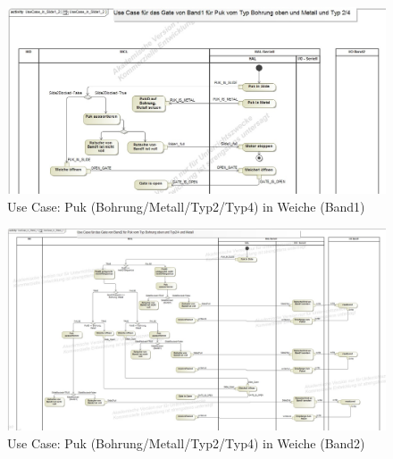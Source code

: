 \documentclass[
   draft=false
  ,paper=a4
  ,twoside=true
  ,fontsize=11pt
  ,headsepline
  ,DIV11
  ,parskip=full+
]{scrartcl} %
\begin{document}
\begin{figure}[H]
\begin{addmargin*}[-2.25cm]{0.1\textwidth}

  	\centering
    \includegraphics [width=1.3\textwidth]{./IMG/UseCaseInSlide12.jpg}
    \caption[short Name]{Use Case: Puk (Bohrung/Metall/Typ2/Typ4) in Weiche (Band1)}
    	\label{fig:uc3slide}
\end{addmargin*}
\end{figure}

\begin{figure}[H]
\begin{addmargin*}[0cm]{-0.16\textwidth}
  	\centering
    \includegraphics [width=1.3\textwidth]{./IMG/UseCaseInSlide21.jpg}
    \caption[short Name]{Use Case: Puk (Bohrung/Metall/Typ2/Typ4) in Weiche (Band2)}
   \label{fig:uc3slide}
\end{addmargin*}
\end{figure}
\end{document}

